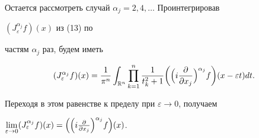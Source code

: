 \begin{pf}
Остается рассмотреть случай $\alpha_j=2,4,\dotsc$ Проинтегрировав


$(J^{\alpha_j}_\varepsilon f)(x)$ из (13) по


частям $\alpha_j$ раз, будем иметь


$$


(J^{\alpha_j}_\varepsilon f)(x)=\frac{1}{\pi^n}


\int_{\Bbb R^n}\prod^n_{k=1}\frac{1}{t^2_k+1}


\biggl(\Bigl(i\frac{\partial}{\partial x_j}\Bigr)^{\alpha_j}f


\biggr)(x-\varepsilon t)dt.


$$


Переходя в этом равенстве к пределу при $\varepsilon\to 0$, получаем


$\lim\limits_{\varepsilon\to 0}(J^{\alpha_j}_\varepsilon f)(x)=


\Bigl(\Bigl(i\frac{\partial}{\partial x_j}\Bigr)^{\alpha_j}f


\Bigr)(x)$.


\end{pf}








